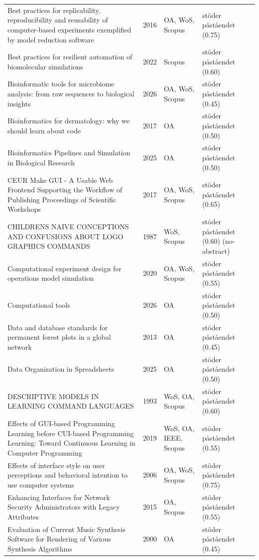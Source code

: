 \begin{longtable}{@{}%
  >{\raggedright\arraybackslash}p{}c%
  >{\raggedright\arraybackslash}p{}%
  >{\raggedright\arraybackslash}p{}@{}}
Best practices for replicability, reproducibility and reusability of computer-based experiments exemplified by model reduction software & 2016 & OA, WoS, Scopus & stöder påståendet (0.75) \\
Best practices for resilient automation of biomolecular simulations & 2022 & Scopus & stöder påståendet (0.60) \\
Bioinformatic tools for microbiome analysis: from raw sequences to biological insights & 2026 & OA, WoS, Scopus & stöder påståendet (0.45) \\
Bioinformatics for dermatology: why we should learn about code & 2017 & OA & stöder påståendet (0.50) \\
Bioinformatics Pipelines and Simulation in Biological Research & 2025 & OA & stöder påståendet (0.50) \\
CEUR Make GUI - A Usable Web Frontend Supporting the Workflow of Publishing Proceedings of Scientific Workshops & 2017 & OA, WoS, Scopus & stöder påståendet (0.65) \\
CHILDRENS NAIVE CONCEPTIONS AND CONFUSIONS ABOUT LOGO GRAPHICS COMMANDS & 1987 & WoS, Scopus & stöder påståendet (0.60) (no-abstract) \\
Computational experiment design for operations model simulation & 2020 & OA, WoS, Scopus & stöder påståendet (0.55) \\
Computational tools & 2026 & OA & stöder påståendet (0.50) \\
Data and database standards for permanent forest plots in a global network & 2013 & OA & stöder påståendet (0.45) \\
Data Organization in Spreadsheets & 2025 & OA & stöder påståendet (0.50) \\
DESCRIPTIVE MODELS IN LEARNING COMMAND LANGUAGES & 1993 & WoS, OA, Scopus & stöder påståendet (0.60) \\
Effects of GUI-based Programming Learning before CUI-based Programming Learning: Toward Continuous Learning in Computer Programming & 2019 & WoS, OA, IEEE, Scopus & stöder påståendet (0.55) \\
Effects of interface style on user perceptions and behavioral intention to use computer systems & 2006 & OA, WoS, Scopus & stöder påståendet (0.75) \\
Enhancing Interfaces for Network Security Administrators with Legacy Attributes & 2015 & OA, Scopus & stöder påståendet (0.55) \\
Evaluation of Current Music Synthesis Software for Rendering of Various Synthesis Algorithms & 2000 & OA & stöder påståendet (0.45) \\

\end{longtable}
